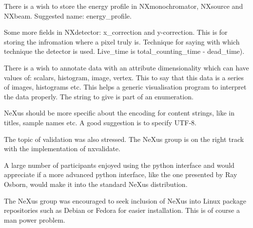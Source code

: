 \documentclass[a4paper]{article}\usepackage[dvips]{graphicx}
\begin{document}
There is a wish to store the energy profile in NXmonochromator, NXsource and NXbeam. Suggested 
name: energy\_profile.  


Some more fields in NXdetector: x\_correction and y-correction. This is for storing the infromation 
where a pixel truly is. Technique for saying with which technique the detector is used. Live\_time 
is total\_counting\_time - dead\_time). 


There is a wish to annotate data with an attribute dimensionality which can have values of:
scalars, histogram, image, vertex. This to say that this data is a series of images, 
histograms etc. This helps a generic visualisation program to interpret the data properly. The 
string to give is part of an enumeration. 


NeXus should be more specific about the encoding for content strings, like in titles, 
sample names etc. A good suggestion is to specify UTF-8.   


The topic of validation was also stressed. The NeXus group is on the right track with the 
implementation of nxvalidate. 

A large number of participants enjoyed using the python interface and would appreciate if a more 
advanced python interface, like the one presented by Ray Osborn, would make it into the standard 
NeXus distribution.


The NeXus group was encouraged to seek inclusion of NeXus into Linux package repositories 
such as Debian or Fedora for easier installation. This is of course a man power problem.  
\end{document}
